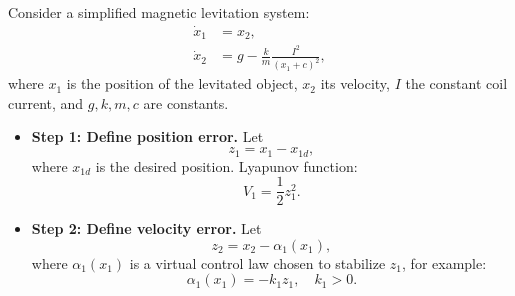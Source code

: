 \begin{example}



Consider a simplified magnetic levitation system:
\begin{align}
    \dot{x}_1 &= x_2, \\
    \dot{x}_2 &= g - \frac{k}{m}\frac{I^2}{(x_1 + c)^2},
\end{align}
where $x_1$ is the position of the levitated object, $x_2$ its velocity, $I$ the constant coil current, and $g, k, m, c$ are constants.  

\begin{center}
\end{center}

\begin{itemize}
    \item \textbf{Step 1: Define position error.} Let
    \begin{equation}
        z_1 = x_1 - x_{1d},
    \end{equation}
    where $x_{1d}$ is the desired position. Lyapunov function:
    \begin{equation}
        V_1 = \frac{1}{2} z_1^2.
    \end{equation}

    \item \textbf{Step 2: Define velocity error.} Let
    \begin{equation}
        z_2 = x_2 - \alpha_1(x_1),
    \end{equation}
    where $\alpha_1(x_1)$ is a virtual control law chosen to stabilize $z_1$, for example:
    \begin{equation}
        \alpha_1(x_1) = -k_1 z_1, \quad k_1>0.
    \end{equation}
    

\end{itemize}
\end{example}
